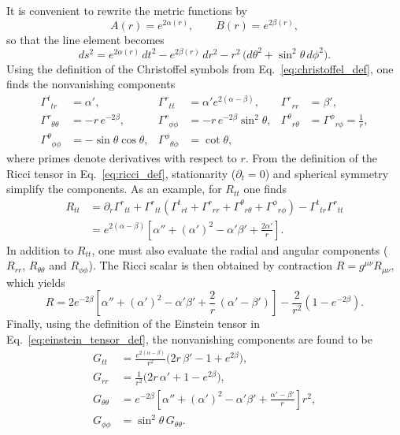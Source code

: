 It is convenient to rewrite the metric functions by
\begin{equation}
A(r)=e^{2\alpha(r)},\qquad B(r)=e^{2\beta(r)},
\end{equation}
so that the line element becomes
\begin{equation}
ds^{2}=e^{2\alpha(r)}\,dt^{2}-e^{2\beta(r)}\,dr^{2}-r^{2}\,\bigl(d\theta^{2}+\sin^{2}\theta\,d\phi^{2}\bigr).
\label{eq:sss_alpha_beta}
\end{equation}
Using the definition of the Christoffel symbols from Eq.~\eqref{eq:christoffel_def}, one finds the nonvanishing components
\begin{align}
\Gamma^{t}{}_{tr} &= \alpha', &
\Gamma^{r}{}_{tt} &= \alpha' e^{2(\alpha-\beta)}, &
\Gamma^{r}{}_{rr} &= \beta', \nonumber\\[4pt]
\Gamma^{r}{}_{\theta\theta} &= -r\,e^{-2\beta}, &
\Gamma^{r}{}_{\phi\phi} &= -r\,e^{-2\beta}\sin^{2}\theta, &
\Gamma^{\theta}{}_{r\theta} &= \Gamma^{\phi}{}_{r\phi}=\tfrac{1}{r}, \nonumber\\[2pt]
\Gamma^{\theta}{}_{\phi\phi} &= -\sin\theta\cos\theta, &
\Gamma^{\phi}{}_{\theta\phi} &= \cot\theta,
\label{eq:Gamma_subset}
\end{align}
where primes denote derivatives with respect to $r$.
From the definition of the Ricci tensor in Eq.~\eqref{eq:ricci_def},
stationarity ($\partial_{t}=0$) and spherical symmetry simplify the components. 
As an example, for $R_{tt}$ one finds
\begin{align}
R_{tt}
&=\partial_{r}\Gamma^{r}{}_{tt}
+\Gamma^{r}{}_{tt}\!\left(\Gamma^{t}{}_{rt}+\Gamma^{r}{}_{rr}+\Gamma^{\theta}{}_{r\theta}+\Gamma^{\phi}{}_{r\phi}\right)
-\Gamma^{t}{}_{tr}\Gamma^{r}{}_{tt}\nonumber\\[2pt]
&=e^{2(\alpha-\beta)}\!\left[\alpha''+(\alpha')^{2}-\alpha'\beta'+\frac{2\alpha'}{r}\right].
\label{eq:Rtt_result}
\end{align}
In addition to $R_{tt}$, one must also evaluate the radial and angular components 
($R_{rr}$, $R_{\theta\theta}$ and $R_{\phi\phi}$). 
The Ricci scalar is then obtained by contraction $R = g^{\mu\nu}R_{\mu\nu}$, which yields
\begin{equation}
R
=2e^{-2\beta}\!\left[\alpha''+(\alpha')^{2}-\alpha'\beta'+\frac{2}{r}\,(\alpha'-\beta')\right]
-\frac{2}{r^{2}}\!\left(1-e^{-2\beta}\right).
\label{eq:R_scalar}
\end{equation}
Finally, using the definition of the Einstein tensor in
Eq.~\eqref{eq:einstein_tensor_def}, the nonvanishing components are found to be
\begin{align}
G_{tt} &= \frac{e^{2(\alpha-\beta)}}{r^{2}}\Big(2r\,\beta'-1+e^{2\beta}\Big), \label{eq:Gtt_final}\\[6pt]
G_{rr} &= \frac{1}{r^{2}}\Big(2r\,\alpha'+1-e^{2\beta}\Big), \nonumber\\[6pt]
G_{\theta\theta} &= e^{-2\beta}\!\left[\alpha''+(\alpha')^{2}-\alpha'\beta'
+\frac{\alpha'-\beta'}{r}\right]r^{2}, \label{eq:GrGth_cov}\\[6pt]
G_{\phi\phi} &= \sin^{2}\theta\,G_{\theta\theta}. \nonumber
\end{align}


